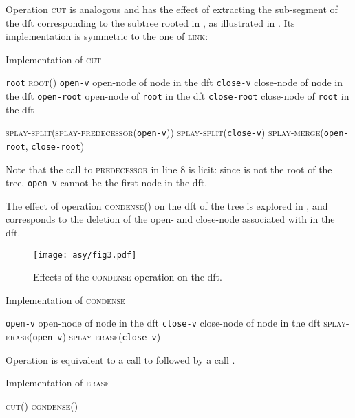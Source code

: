 \documentclass[a4paper,USenglish]{lipics}
\newcommand{\var}[1]{\textrm{\texttt{#1}}}
\begin{document}
		Operation \textsc{cut} is analogous and has the effect of extracting the sub-segment of the dft corresponding to the subtree rooted in , as illustrated in . Its implementation is symmetric to the one of \textsc{link}:
		\begin{algorithm}[H]
		  \small
		  \caption{\small Implementation of \textsc{cut}}
		  \begin{algorithmic}[1]
		    \State \var{root}  \textsc{root}()
		    \If{  \var{root}}
				\State \var{open-v}  open-node of node  in the dft
				\State \var{close-v}  close-node of node  in the dft
				\State \var{open-root}  open-node of \var{root} in the dft
				\State \var{close-root}  close-node of \var{root} in the dft

				\State \textsc{splay-split}(\textsc{splay-predecessor}(\var{open-v}))
				\State \textsc{splay-split}(\var{close-v})
				\State \textsc{splay-merge}(\var{open-root}, \var{close-root})
		    \EndIf
		    \EndProcedure
		  \end{algorithmic}
		\end{algorithm}	
		Note that the call to \textsc{predecessor} in line 8 is licit: since  is not the root of the tree, \var{open-v} cannot be the first node in the dft.
		
		The effect of operation \textsc{condense}() on the dft of the tree is explored in , and corresponds to the deletion of the open- and close-node associated with  in the dft.
\begin{figure}[t]\centering 
	\texttt{[image: asy/fig3.pdf]}
			\caption{Effects of the \textsc{condense} operation on the dft.\label{fig:condense}}
		\end{figure}
		\begin{algorithm}[H]
		  \small
		  \caption{\small Implementation of \textsc{condense}}
		  \begin{algorithmic}[1]
			\State \var{open-v}  open-node of node  in the dft
			\State \var{close-v}  close-node of node  in the dft
			\State \textsc{splay-erase}(\var{open-v})
			\State \textsc{splay-erase}(\var{close-v})
		    \EndProcedure
		  \end{algorithmic}
		\end{algorithm}

		Operation  is equivalent to a call to  followed by a call .
		\begin{algorithm}[H]
		  \small
		  \caption{\small Implementation of \textsc{erase}}
		  \begin{algorithmic}[1]
			\State \textsc{cut}()
			\State \textsc{condense}()
		    \EndProcedure
		  \end{algorithmic}
		\end{algorithm}		 
		
\end{document}
